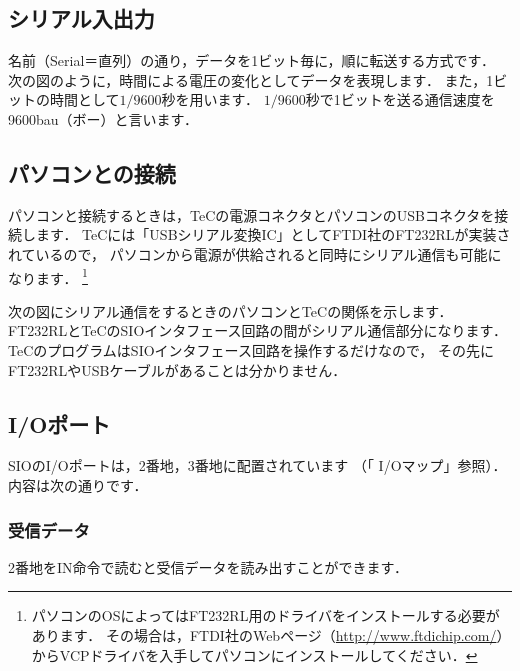 \subsection{シリアル入出力}
名前（Serial＝直列）の通り，データを1ビット毎に，順に転送する方式です．
次の図のように，時間による電圧の変化としてデータを表現します．
また，1ビットの時間として$1/9600$秒を用います．
$1/9600$秒で1ビットを送る通信速度を9600bau（ボー）と言います．

\begin{center}
\end{center}

\subsection{パソコンとの接続}
パソコンと接続するときは，TeCの電源コネクタとパソコンのUSBコネクタを接続します．
TeCには「USBシリアル変換IC」としてFTDI社のFT232RLが実装されているので，
パソコンから電源が供給されると同時にシリアル通信も可能になります．
\footnote{パソコンのOSによってはFT232RL用のドライバをインストールする必要があります．
  その場合は，FTDI社のWebページ（\url{http://www.ftdichip.com/}）
  からVCPドライバを入手してパソコンにインストールしてください．}

次の図にシリアル通信をするときのパソコンとTeCの関係を示します．
FT232RLとTeCのSIOインタフェース回路の間がシリアル通信部分になります．
TeCのプログラムはSIOインタフェース回路を操作するだけなので，
その先にFT232RLやUSBケーブルがあることは分かりません．

\begin{center}
\end{center}

\subsection{I/Oポート}
\label{sioport}

SIOのI/Oポートは，2番地，3番地に配置されています
（「 I/Oマップ」参照）．
内容は次の通りです．

\subsubsection{受信データ}
2番地をIN命令で読むと受信データを読み出すことができます．

